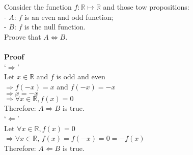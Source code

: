 \documentclass{article}
\begin{document}
\noindent Consider the function $f : \mathbb{R} \mapsto \mathbb{R}$ and those tow propositions:\\
- $A$: $f$ is an even and odd function;\\
- $B$: $f$ is the null function.\\
Proove that $A \iff B$.\\\\
\textbf{Proof}\\
`$\Rightarrow$'\\
Let $x \in \mathbb{R}$ and $f$ is odd and even\\
$\Rightarrow f(-x) = x$ and $f(-x) = -x$\\
$\Rightarrow x = -x$\\
$\Rightarrow \forall x \in \mathbb{R}, f(x) = 0$\\
Therefore: $A \Rightarrow B$ is true.\\
`$\Leftarrow$'\\
Let $\forall x \in \mathbb{R}, f(x) = 0$\\
$\Rightarrow \forall  x \in \mathbb{R}$, $f(x) = f(-x) = 0 = -f(x) $\\
Therefore: $A \Leftarrow B$ is true.\\
\end{document}

